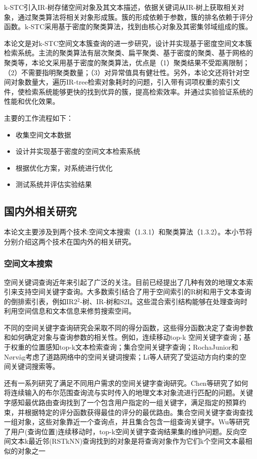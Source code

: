 k-STC引入IR-树存储空间对象及其文本描述，依据关键词从IR-树上获取相关对象，通过聚类算法将相关对象形成簇。簇的形成依赖于参数，簇的排名依赖于评分函数。k-STC采用基于密度的聚类算法，找到由核心对象及其密集邻域组成的簇。

本论文是对k-STC空间文本簇查询的进一步研究，设计并实现基于密度空间文本簇检索系统。主流的聚类算法有层次聚类、扁平聚类、基于密度的聚类、基于网格的聚类等，本论文采用基于密度的聚类算法，优点是（1）聚类结果不受距离限制；（2）不需要指明聚类数量；（3）对异常值具有健壮性。另外，本论文还将针对空间对象数量大，遍历IR-tree检索对象耗时的问题，引入带有词项权重的索引文件，使检索系统能够更快的找到优异的簇，提高检索效率。并通过实验验证系统的性能和优化效果。

主要的工作流程如下：
\begin{itemize}
	\item 收集空间文本数据
	\item 设计并实现基于密度的空间文本检索系统
	\item 根据优化方案，对系统进行优化
	\item 测试系统并评估实验结果
\end{itemize}

\subsection{国内外相关研究}
本论文主要涉及到两个技术:空间文本搜索（1.3.1）和聚类算法（1.3.2）。本小节将分别介绍这两个技术在国内外的相关研究。


\subsubsection{空间文本搜索}
空间关键词查询近年来引起了广泛的关注。目前已经提出了几种有效的地理文本索引来支持空间关键字查询。大多数索引结合了用于空间索引的R树和用于文本查询的倒排索引表，例如IR2$^2$-树、IR-树和S2I。这些混合索引结构能够在处理查询时利用空间信息和文本信息来修剪搜索空间。

不同的空间关键字查询研究会采取不同的得分函数，这些得分函数决定了查询参数和如何确定对象与查询参数的相关性。例如，连续移动top-k 空间关键字查询；基于权重的位置感知top-k文本检索查询；集合空间关键字查询；RochaJunior和Nørvåg考虑了道路网络中的空间关键词搜索；Li等人研究了受运动方向约束的空间关键词搜索等。

还有一系列研究了满足不同用户需求的空间关键字查询研究。Chen等研究了如何将连续输入的布尔范围查询流与实时传入的地理文本对象流进行匹配的问题。关键字感知最优路由查询找到了一个包含用户指定的一组关键字，满足指定的预算约束，并根据特定的评分函数获得最佳的评分的最优路由。集合空间关键字查询查找一组对象，这些对象靠近一个查询点，并且集合包含一组查询关键字。Wu等研究了用户(查询位置)连续移动时，top-k空间关键字查询结果集的维护问题。反向空间文本k最近邻(RSTkNN)查询找到的对象是将查询对象作为它们k个空间文本最相似的对象之一

